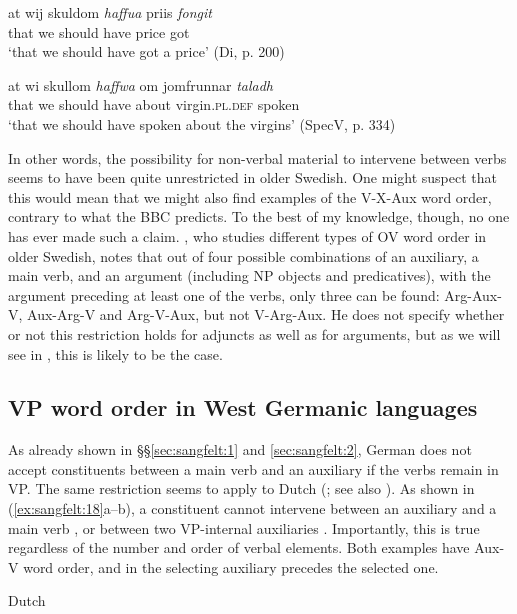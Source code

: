 \documentclass[output=paper, colorlinks, citecolor=brown]{langscibook}
\begin{document}
\ex\label{ex:sangfelt:17c}
\gll at wij skuldom \textit{haffua} {priis} \textit{fongit} \\
 that we should have price got\\
\glt ‘that we should have got a price' (Di, p. 200)

\ex\label{ex:sangfelt:17d}
\gll at wi skullom \textit{haffwa} {om} {jomfrunnar} \textit{taladh} \\
 that we should have about virgin.\textsc{pl.def} spoken\\
\glt ‘that we should have spoken about the virgins’ (SpecV, p. 334)
\z 
\z 

In other words, the possibility for non-verbal material to intervene between verbs seems to have been quite unrestricted in older Swedish. One might suspect that this would mean that we might also find examples of the V-X-Aux word order, contrary to what the BBC predicts. To the best of my knowledge, though, no one has ever made such a claim. \citet[155, 158–160]{Petzell2011}, who studies different types of OV word order in older Swedish, notes that out of four possible combinations of an auxiliary, a main verb, and an argument (including NP objects and predicatives), with the argument preceding at least one of the verbs, only three can be found: Arg-Aux-V, Aux-Arg-V and Arg-V-Aux, but not V-Arg-Aux. He does not specify whether or not this restriction holds for adjuncts as well as for arguments, but as we will see in , this is likely to be the case.

\subsection{VP word order in West Germanic languages}\label{sec:sangfelt:3.3}

As already shown in §§\ref{sec:sangfelt:1} and \ref{sec:sangfelt:2}, German does not accept constituents between a main verb and an auxiliary if the verbs remain in VP. The same restriction seems to apply to Dutch (\citealt[290--291]{Haider2010}; see also \citealt{Wurmbrand2004}). As shown in (\ref{ex:sangfelt:18}a–b), a constituent cannot intervene between an auxiliary and a main verb , or between two VP-internal auxiliaries . Importantly, this is true regardless of the number and order of verbal elements. Both examples have Aux-V word order, and in  the selecting auxiliary precedes the selected one.

\ea Dutch\label{ex:sangfelt:18}
\end{document}
